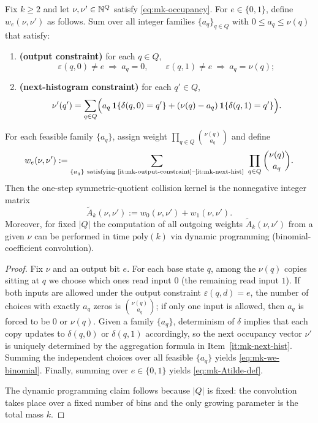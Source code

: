 \begin{proposition}\label{prop:mk-histogram-transition}
Fix $k\ge 2$ and let $\nu,\nu'\in\mathbb{N}^Q$ satisfy \eqref{eq:mk-occupancy}.
For $e\in\{0,1\}$, define $w_e(\nu,\nu')$ as follows.
Sum over all integer families $\{a_q\}_{q\in Q}$ with $0\le a_q\le \nu(q)$ that satisfy:
\begin{enumerate}
  \item\label{it:mk-output-constraint}\textbf{(output constraint)} for each $q\in Q$,
  \[
  \varepsilon(q,0)\neq e\ \Rightarrow\ a_q=0,
  \qquad
  \varepsilon(q,1)\neq e\ \Rightarrow\ a_q=\nu(q);
  \]
  \item\label{it:mk-next-hist}\textbf{(next-histogram constraint)} for each $q'\in Q$,
  \[
  \nu'(q')
  =
  \sum_{q\in Q}\Bigl(
  a_q\,\mathbf{1}\{\delta(q,0)=q'\}+(\nu(q)-a_q)\,\mathbf{1}\{\delta(q,1)=q'\}
  \Bigr).
  \]
\end{enumerate}
For each feasible family $\{a_q\}$, assign weight $\prod_{q\in Q}\binom{\nu(q)}{a_q}$ and define
\begin{equation}\label{eq:mk-we-binomial}
w_e(\nu,\nu')
:=
\sum_{\{a_q\}\ \text{satisfying \ref{it:mk-output-constraint}--\ref{it:mk-next-hist}}}
\ \prod_{q\in Q}\binom{\nu(q)}{a_q}.
\end{equation}
Then the one-step symmetric-quotient collision kernel is the nonnegative integer matrix
\begin{equation}\label{eq:mk-Atilde-def}
\widetilde A_k(\nu,\nu'):=w_0(\nu,\nu')+w_1(\nu,\nu').
\end{equation}
Moreover, for fixed $|Q|$ the computation of all outgoing weights $\widetilde A_k(\nu,\nu')$ from a given $\nu$ can be performed in time $\mathrm{poly}(k)$ via dynamic programming (binomial-coefficient convolution).
\end{proposition}

\begin{proof}
Fix $\nu$ and an output bit $e$.
For each base state $q$, among the $\nu(q)$ copies sitting at $q$ we choose which ones read input $0$ (the remaining read input $1$).
If both inputs are allowed under the output constraint $\varepsilon(q,d)=e$, the number of choices with exactly $a_q$ zeros is $\binom{\nu(q)}{a_q}$; if only one input is allowed, then $a_q$ is forced to be $0$ or $\nu(q)$.
Given a family $\{a_q\}$, determinism of $\delta$ implies that each copy updates to $\delta(q,0)$ or $\delta(q,1)$ accordingly, so the next occupancy vector $\nu'$ is uniquely determined by the aggregation formula in Item~\ref{it:mk-next-hist}.
Summing the independent choices over all feasible $\{a_q\}$ yields \eqref{eq:mk-we-binomial}.
Finally, summing over $e\in\{0,1\}$ yields \eqref{eq:mk-Atilde-def}.
\par
The dynamic programming claim follows because $|Q|$ is fixed: the convolution takes place over a fixed number of bins and the only growing parameter is the total mass $k$.
\end{proof}

